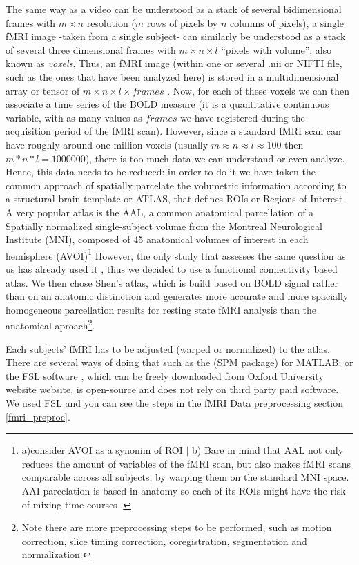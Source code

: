 \documentclass[a4paper,12pt]{elsarticle}  %
\begin{document}
The same way as a video can be understood as a stack of several bidimensional frames with  $m \times n$ resolution ($m$ rows of pixels by $n$ columns of pixels), a single fMRI image -taken from a single subject- can similarly be understood as a stack of several three dimensional frames with $m \times n \times l$ ``pixels with volume'', also known as \textit{voxels}. Thus, an fMRI image (within one or several .nii or NIFTI file, such as the ones that have been analyzed here) is stored in a multidimensional array or tensor of $m \times n \times l \times frames$ \cite{Larobina2014200}. Now, for each of these voxels we can then associate a time series of the BOLD measure (it is a quantitative continuous variable, with as many values as $frames$ we have registered during the acquisition period of the fMRI scan). However, since a standard fMRI scan can have roughly around one million voxels (usually $ m \approx n \approx l \approx 100 $ then $m * n * l = 1 000 000 $), there is too much data we can understand or even analyze. Hence, this data needs to be reduced: in order to do it we have taken the common approach of spatially parcelate the volumetric information according to a structural brain template or ATLAS, that defines ROIs or Regions of Interest \cite{Rathore2017530}. A very popular atlas is the AAL, a common anatomical parcellation of a Spatially normalized single-subject volume from the Montreal Neurological Institute (MNI), composed of 45 anatomical volumes of interest in each hemisphere (AVOI)\footnote{a)consider AVOI as a synonim of ROI $|$ b) Bare in mind that AAL not only reduces the amount of variables of the fMRI scan, but also makes fMRI scans comparable across all subjects, by warping them on the standard MNI space\cite{Tzourio-Mazoyer2002273}. AAI parcelation is based in anatomy so each of its ROIs might have the risk of mixing time courses \cite{Shen2013403}.} However, the only study that assesses the same question as us has already used it \cite{Hojjati201769}, thus we decided to use a functional connectivity based atlas. We then chose Shen's atlas, which is build based on BOLD signal rather than on an anatomic distinction and generates more accurate and more spacially homogeneous parcellation results for resting state fMRI analysis than the anatomical aproach\cite{Shen2013403}\footnote{Note there are more preprocessing steps to be performed, such as motion correction, slice timing correction, coregistration, segmentation and normalization.}.


Each subjects' fMRI has to be adjusted (warped or normalized) to the atlas. There are several ways of doing that such as the (\href{http://www.fil.ion.ucl.ac.uk/spm/}{SPM package}) for MATLAB; or the FSL software \cite{Jenkinson2012782}, which can be freely downloaded from Oxford University website \href{https://fsl.fmrib.ox.ac.uk/fsl/fslwiki}{website}\cite{oxford_fsl_web}, is open-source and does not rely on third party paid software. We used FSL and you can see the steps in the fMRI Data preprocessing section \ref{fmri_preproc}.
 
\end{document}
